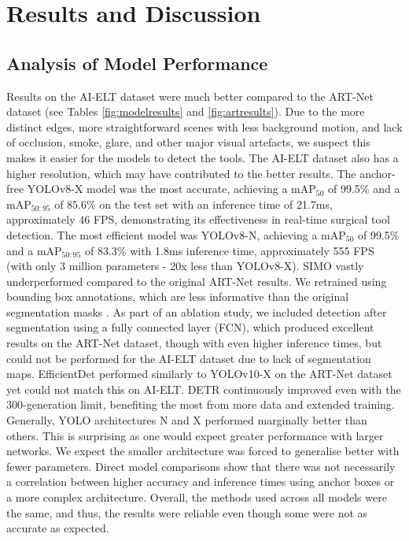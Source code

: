 \section{Results and Discussion}

\subsection{Analysis of Model Performance}

Results on the AI-ELT dataset were much better compared to the ART-Net dataset (see Tables \ref{fig:modelresults} and \ref{fig:artresults}). Due to the more distinct edges, more straightforward scenes with less background motion, and lack of occlusion, smoke, glare, and other major visual artefacts, we suspect this makes it easier for the models to detect the tools. The AI-ELT dataset also has a higher resolution, which may have contributed to the better results. The anchor-free YOLOv8-X model was the most accurate, achieving a mAP$_{50}$ of 99.5\% and a mAP$_{50:95}$ of 85.6\% on the test set with an inference time of 21.7ms, approximately 46 FPS, demonstrating its effectiveness in real-time surgical tool detection. The most efficient model was YOLOv8-N, achieving a mAP$_{50}$ of 99.5\% and a mAP$_{50:95}$ of 83.3\% with 1.8ms inference time, approximately 555 FPS (with only 3 million parameters - 20x less than YOLOv8-X). SIMO vastly underperformed compared to the original ART-Net results. We retrained using bounding box annotations, which are less informative than the original segmentation masks \cite{hasan_detection_2021}. As part of an ablation study, we included detection after segmentation using a fully connected layer (FCN), which produced excellent results on the ART-Net dataset, though with even higher inference times, but could not be performed for the AI-ELT dataset due to lack of segmentation maps. EfficientDet performed similarly to YOLOv10-X on the ART-Net dataset yet could not match this on AI-ELT. DETR continuously improved even with the 300-generation limit, benefiting the most from more data and extended training. Generally, YOLO architectures N and X performed marginally better than others. This is surprising as one would expect greater performance with larger networks. We expect the smaller architecture was forced to generalise better with fewer parameters. Direct model comparisons show that there was not necessarily a correlation between higher accuracy and inference times using anchor boxes or a more complex architecture. Overall, the methods used across all models were the same, and thus, the results were reliable even though some were not as accurate as expected. 


